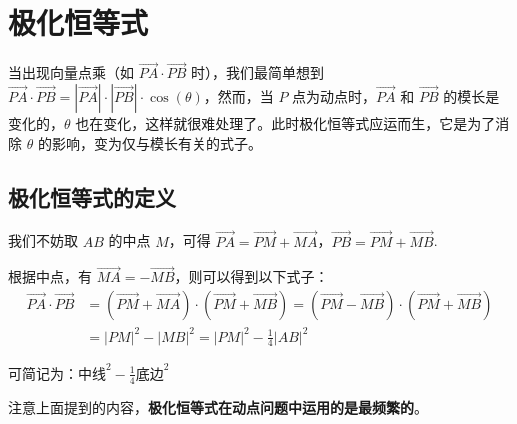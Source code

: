 \section{极化恒等式}
当出现向量点乘（如 $\overrightarrow{PA} \cdot \overrightarrow{PB}$ 时），我们最简单想到 $\overrightarrow{PA} \cdot \overrightarrow{PB} = |\overrightarrow{PA}| \cdot |\overrightarrow{PB}| \cdot \cos(\theta)$，然而，当 $P$ 点为动点时，$\overrightarrow{PA}$ 和 $\overrightarrow{PB}$ 的模长是变化的，$\theta$ 也在变化，这样就很难处理了。此时极化恒等式应运而生，它是为了消除 $\theta$ 的影响，变为仅与模长有关的式子。

\subsection{极化恒等式的定义}
\begin{definition}
    我们不妨取 $AB$ 的中点 $M$，可得 $\overrightarrow{PA} = \overrightarrow{PM} + \overrightarrow{MA}$，$ \overrightarrow{PB} = \overrightarrow{PM} + \overrightarrow{MB}$.

    根据中点，有 $\overrightarrow{MA} = -\overrightarrow{MB}$，则可以得到以下式子：
    \begin{align}
        \overrightarrow{PA} \cdot \overrightarrow{PB} & =(\overrightarrow{PM} + \overrightarrow{MA}) \cdot (\overrightarrow{PM} + \overrightarrow{MB}) = (\overrightarrow{PM} - \overrightarrow{MB}) \cdot (\overrightarrow{PM} + \overrightarrow{MB}) \\
                                                      & = |PM|^2 - |MB|^2 = |PM|^2 - \frac{1}{4}|AB|^2
    \end{align}

    \begin{minipage}{0.3\textwidth}
    \end{minipage}
    \begin{minipage}{0.7\textwidth}
        可简记为：$\text{中线}^2 - \frac{1}{4}\text{底边}^2$

        注意上面提到的内容，\textbf{极化恒等式在动点问题中运用的是最频繁的}。
    \end{minipage}

\end{definition}

